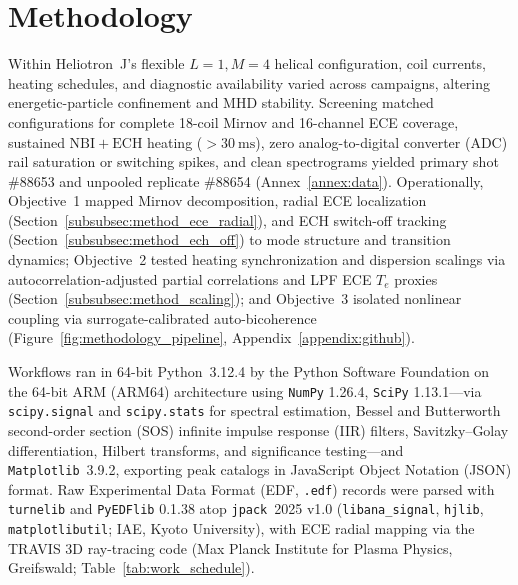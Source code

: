\newpage

\section{Methodology}

Within Heliotron~J's flexible $L=1, M=4$ helical configuration, coil currents, heating schedules, and diagnostic availability varied across campaigns, altering energetic-particle confinement and MHD stability. Screening matched configurations for complete 18-coil Mirnov and 16-channel ECE coverage, sustained $\mathrm{NBI}+\mathrm{ECH}$ heating ($>30~\mathrm{ms}$), zero analog-to-digital converter (ADC) rail saturation or switching spikes, and clean spectrograms yielded primary shot \#88653 and unpooled replicate \#88654 (Annex~\ref{annex:data}). Operationally, Objective~1 mapped Mirnov decomposition, radial ECE localization (Section~\ref{subsubsec:method_ece_radial}), and ECH switch-off tracking (Section~\ref{subsubsec:method_ech_off}) to mode structure and transition dynamics; Objective~2 tested heating synchronization and dispersion scalings via autocorrelation-adjusted partial correlations and LPF ECE $T_e$ proxies (Section~\ref{subsubsec:method_scaling}); and Objective~3 isolated nonlinear coupling via surrogate-calibrated auto-bicoherence (Figure~\ref{fig:methodology_pipeline}, Appendix~\ref{appendix:github}).

Workflows ran in 64-bit Python~3.12.4 by the Python Software Foundation on the 64-bit ARM (ARM64) architecture using \texttt{NumPy} 1.26.4, \texttt{SciPy} 1.13.1---via \texttt{scipy.\allowbreak signal} and \texttt{scipy.\allowbreak stats} for spectral estimation, Bessel and Butterworth second-order section (SOS) infinite impulse response (IIR) filters, Savitzky--Golay differentiation, Hilbert transforms, and significance testing---and \texttt{Matplotlib}~3.9.2, exporting peak catalogs in JavaScript Object Notation (JSON) format. Raw Experimental Data Format (EDF, \texttt{.edf}) records were parsed with \texttt{turnelib} and \texttt{PyEDFlib} 0.1.38 atop \texttt{jpack}~2025 v1.0 (\texttt{libana\_\allowbreak signal}, \texttt{hjlib}, \texttt{matplotlibutil}; IAE, Kyoto University), with ECE radial mapping via the \textsc{TRAVIS} 3D ray-tracing code (Max Planck Institute for Plasma Physics, Greifswald; Table~\ref{tab:work_schedule}).


